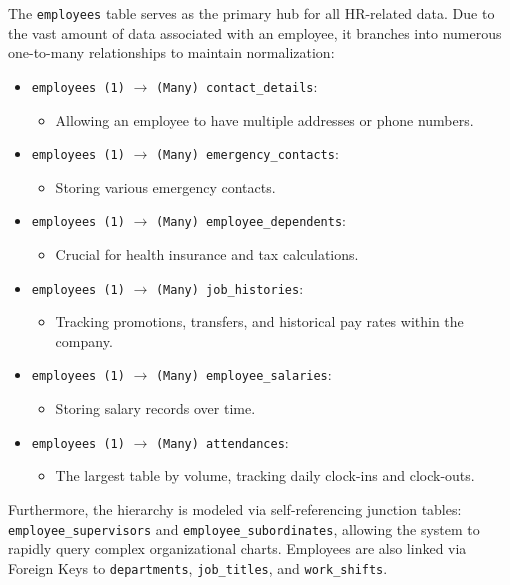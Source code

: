 ﻿\documentclass[12pt,a4paper]{report}
\begin{document}
The \texttt{employees} table serves as the primary hub for all HR-related data. Due to the vast amount of data associated with an employee, it branches into numerous one-to-many relationships to maintain normalization:
\begin{itemize}
    \item \texttt{employees (1)} $\rightarrow$ \texttt{(Many) contact\_details}:
    \begin{itemize}
        \item Allowing an employee to have multiple addresses or phone numbers.
    \end{itemize}
    \item \texttt{employees (1)} $\rightarrow$ \texttt{(Many) emergency\_contacts}:
    \begin{itemize}
        \item Storing various emergency contacts.
    \end{itemize}
    \item \texttt{employees (1)} $\rightarrow$ \texttt{(Many) employee\_dependents}:
    \begin{itemize}
        \item Crucial for health insurance and tax calculations.
    \end{itemize}
    \item \texttt{employees (1)} $\rightarrow$ \texttt{(Many) job\_histories}:
    \begin{itemize}
        \item Tracking promotions, transfers, and historical pay rates within the company.
    \end{itemize}
    \item \texttt{employees (1)} $\rightarrow$ \texttt{(Many) employee\_salaries}:
    \begin{itemize}
        \item Storing salary records over time.
    \end{itemize}
    \item \texttt{employees (1)} $\rightarrow$ \texttt{(Many) attendances}:
    \begin{itemize}
        \item The largest table by volume, tracking daily clock-ins and clock-outs.
    \end{itemize}
\end{itemize}
Furthermore, the hierarchy is modeled via self-referencing junction tables: \texttt{employee\_supervisors} and \texttt{employee\_subordinates}, allowing the system to rapidly query complex organizational charts. Employees are also linked via Foreign Keys to \texttt{departments}, \texttt{job\_titles}, and \texttt{work\_shifts}.
\end{document}
